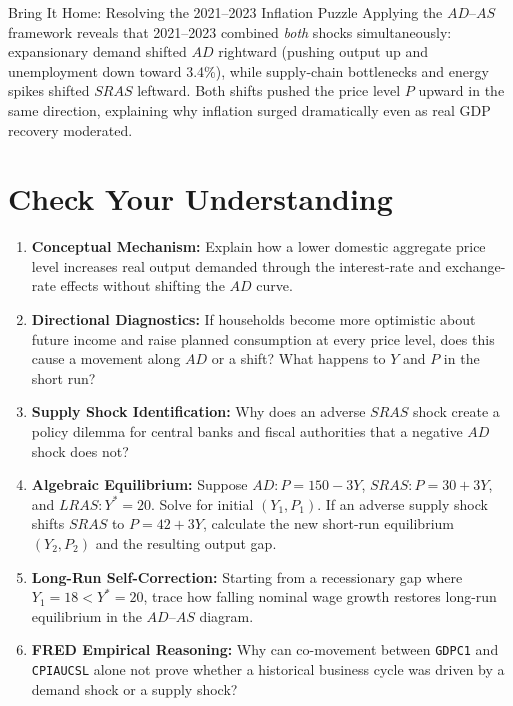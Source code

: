 \documentclass[11pt,letterpaper]{article}
\begin{document}
\begin{examplecase}{Bring It Home: Resolving the 2021--2023 Inflation Puzzle}
Applying the $AD\text{--}AS$ framework reveals that 2021--2023 combined \emph{both} shocks simultaneously: expansionary demand shifted $AD$ rightward (pushing output up and unemployment down toward 3.4\%), while supply-chain bottlenecks and energy spikes shifted $SRAS$ leftward. Both shifts pushed the price level $P$ upward in the same direction, explaining why inflation surged dramatically even as real GDP recovery moderated.
\end{examplecase}

\section{Check Your Understanding}
\begin{enumerate}
    \item \textbf{Conceptual Mechanism:} Explain how a lower domestic aggregate price level increases real output demanded through the interest-rate and exchange-rate effects without shifting the $AD$ curve.
    \item \textbf{Directional Diagnostics:} If households become more optimistic about future income and raise planned consumption at every price level, does this cause a movement along $AD$ or a shift? What happens to $Y$ and $P$ in the short run?
    \item \textbf{Supply Shock Identification:} Why does an adverse $SRAS$ shock create a policy dilemma for central banks and fiscal authorities that a negative $AD$ shock does not?
    \item \textbf{Algebraic Equilibrium:} Suppose $AD: P = 150 - 3Y$, $SRAS: P = 30 + 3Y$, and $LRAS: Y^* = 20$. Solve for initial $(Y_1, P_1)$. If an adverse supply shock shifts $SRAS$ to $P = 42 + 3Y$, calculate the new short-run equilibrium $(Y_2, P_2)$ and the resulting output gap.
    \item \textbf{Long-Run Self-Correction:} Starting from a recessionary gap where $Y_1 = 18 < Y^* = 20$, trace how falling nominal wage growth restores long-run equilibrium in the $AD\text{--}AS$ diagram.
    \item \textbf{FRED Empirical Reasoning:} Why can co-movement between \texttt{GDPC1} and \texttt{CPIAUCSL} alone not prove whether a historical business cycle was driven by a demand shock or a supply shock?
\end{enumerate}
\end{document}
